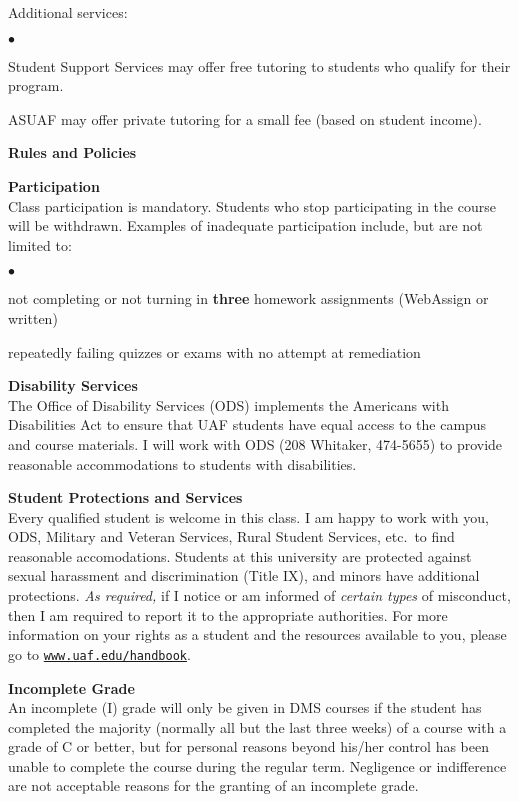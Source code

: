 \documentclass[12pt]{article}
\renewcommand{\emph}[1]{\textsf{\textbf{#1}}}
\newcommand{\localhead}[1]{\par\smallskip\textbf{#1}\nobreak\\}%
\def\heading#1{\localhead{\large\emph{#1}}}
\def\subheading#1{\localhead{\emph{#1}}}
\newenvironment{clist}%
{\bgroup\parskip 0pt\begin{list}{$\bullet$}{\partopsep 4pt\topsep 0pt\itemsep -2pt}}%
{\end{list}\egroup}%
\begin{document}
Additional services:
\begin{clist}
	\item Student Support Services may offer free tutoring to students who qualify for their program.
	\item ASUAF may offer private tutoring for a small fee (based on student income).
\end{clist}


\newpage
\strut

\heading{Rules and Policies}
\vskip -20pt
\subheading{Participation}
Class participation is mandatory.  Students who stop participating in the course will be withdrawn.  Examples of inadequate participation include, but are not limited to:

\begin{clist}
\item not completing or not turning in \textbf{three} homework assignments (WebAssign or written)
\item repeatedly failing quizzes or exams with no attempt at remediation
\end{clist}

\subheading{Disability Services}
The Office of Disability Services (ODS) implements the Americans with Disabilities Act to ensure that UAF students have equal access to the campus and course materials.  I will work with ODS (208 Whitaker, 474-5655) to provide reasonable accommodations to students with disabilities.

\subheading{Student Protections and Services}
Every qualified student is welcome in this class.  I am happy to work with you, ODS, Military and Veteran Services, Rural Student Services, etc.~to find reasonable accomodations.  Students at this university are protected against sexual harassment and discrimination (Title IX), and minors have additional protections. \textit{As required,} if I notice or am informed of \textit{certain types} of misconduct, then I am required to report it to the appropriate authorities.  For more information on your rights as a student and the resources available to you, please go to \href{https://www.uaf.edu/handbook/}{\texttt{www.uaf.edu/handbook}}.

\subheading{Incomplete Grade} 
An incomplete (I) grade will only be given in DMS courses if the student has completed the majority (normally all but the last three weeks) of a course with a grade of C or better, but for personal reasons beyond his/her control has been unable to complete the course during the regular term. Negligence or indifference are not acceptable reasons for the granting of an incomplete grade. 
\end{document}
